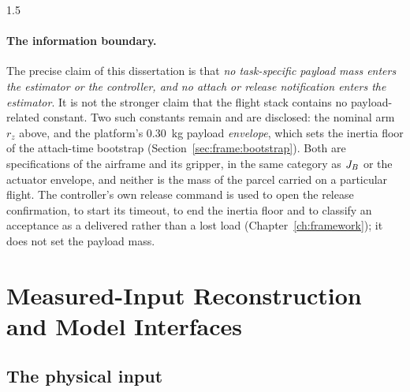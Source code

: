 \begin{spacing}{1.5}
\paragraph{The information boundary.} The precise claim of this dissertation is
that \emph{no task-specific payload mass enters the estimator or the controller,
and no attach or release notification enters the estimator}. It is not the
stronger claim that the flight stack contains no payload-related constant. Two
such constants remain and are disclosed: the nominal arm $r_z$ above, and the
platform's \SI{0.30}{\kg} payload \emph{envelope}, which sets the inertia floor
of the attach-time bootstrap (Section~\ref{sec:frame:bootstrap}). Both are
specifications of the airframe and its gripper, in the same category as $J_B$ or
the actuator envelope, and neither is the mass of the parcel carried on a
particular flight. The controller's own release command is used to open the
release confirmation, to start its timeout, to end the inertia floor and to
classify an acceptance as a delivered rather than a lost load
(Chapter~\ref{ch:framework}); it does not set the payload mass.

\section{Measured-Input Reconstruction and Model Interfaces}\label{sec:model:phys}

\subsection{The physical input}


\end{spacing}
